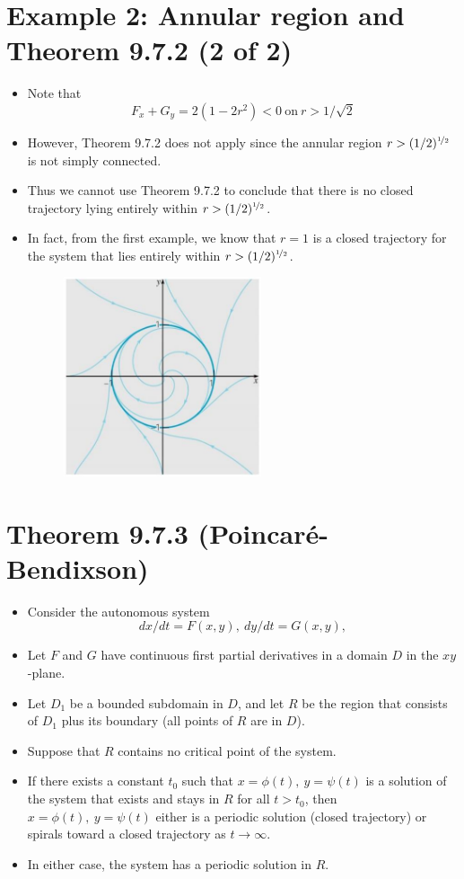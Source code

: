 \documentclass[11pt,a4paper]{article}
\begin{document}
	\section*{Example 2: Annular region and Theorem 9.7.2 (2 of 2)}
	\begin{itemize}
		\item Note that
		$$
		F_x + G_y = 2(1-2r^2)<0\ \text{on}\ r>1/\sqrt{2}
		$$
		\item However, Theorem 9.7.2 does not apply since the annular region $r > (1/2)^{\nicefrac{1}{2}}$ is not simply connected.
		\item Thus we cannot use Theorem 9.7.2 to conclude that there is no closed trajectory lying entirely within $r > (1/2)^{\nicefrac{1}{2}}$.
		\item In fact, from the first example, we know that $r = 1$ is a closed trajectory for the system that lies entirely within $r > (1/2)^{\nicefrac{1}{2}}$.
		\begin{figure}[H]
			\centering
			\includegraphics[width=0.55\textwidth]{figure/Lec19f5.PNG}
		\end{figure}
	\end{itemize}
	\section*{Theorem 9.7.3 (Poincar\'{e}-Bendixson)}
	\begin{itemize}
		\item Consider the autonomous system
		$$
		dx/dt = F(x,y),\ dy/dt = G(x,y),
		$$
		\item Let $F$ and $G$ have continuous first partial derivatives in a domain $D$ in the $xy$-plane.
		\item Let $D_1$ be a bounded subdomain in $D$, and let $R$ be the region that consists of $D_1$ plus its boundary (all points of $R$ are in $D$).
		\item Suppose that $R$ contains no critical point of the system.
		\item If there exists a constant $t_0$ such that $x = \phi(t),\ y = \psi(t)$ is a solution of the system that exists and stays in $R$ for all $t > t_0$, then $x = \phi(t),\ y=\psi(t)$ either is a periodic solution (closed trajectory) or spirals toward a closed trajectory as $t \to \infty$.
		\item In either case, the system has a periodic solution in $R$.
	\end{itemize}
\end{document}
